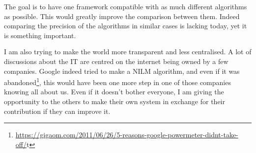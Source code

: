 The goal is to have one framework compatible with as much different algorithms as possible. This would greatly improve the comparison between them. Indeed comparing the precision of the algorithms in similar cases is lacking today, yet it is something important.

I am also trying to make the world more transparent and less centralised. A lot of discussions about the IT are centred on the internet being owned by a few companies. Google indeed tried to make a NILM algorithm, and even if it was abandoned\footnote{\url{https://gigaom.com/2011/06/26/5-reasons-google-powermeter-didnt-take-off/}t}, this would have been one more step in one of those companies knowing all about us. Even if it doesn't bother everyone, I am giving the opportunity to the others to make their own system in exchange for their contribution if they can improve it.